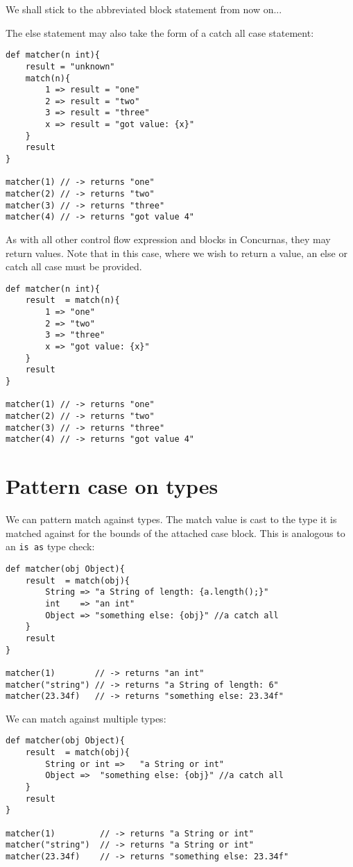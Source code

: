 \documentclass[conc-doc]{subfiles}
\begin{document}
We shall stick to the abbreviated block statement from now on...

The else statement may also take the form of a catch all case statement:
\begin{lstlisting}
def matcher(n int){
	result = "unknown"
	match(n){
		1 => result = "one" 
		2 => result = "two" 
		3 => result = "three" 
		x => result = "got value: {x}" 
	}
	result
}

matcher(1) // -> returns "one"
matcher(2) // -> returns "two"
matcher(3) // -> returns "three"
matcher(4) // -> returns "got value 4"
\end{lstlisting}

As with all other control flow expression and blocks in Concurnas, they may return values. Note that in this case, where we wish to return a value, an else or catch all case must be provided.

\begin{lstlisting}
def matcher(n int){
	result  = match(n){
		1 => "one" 
		2 => "two" 
		3 => "three" 
		x => "got value: {x}" 
	}
	result
}

matcher(1) // -> returns "one"
matcher(2) // -> returns "two"
matcher(3) // -> returns "three"
matcher(4) // -> returns "got value 4"
\end{lstlisting}

\section{Pattern case on types}
We can pattern match against types. The match value is cast to the type it is matched against for the bounds of the attached case block. This is analogous to an \lstinline{is as} type check:

\begin{lstlisting}
def matcher(obj Object){
	result  = match(obj){
		String => "a String of length: {a.length();}" 
		int    => "an int" 
		Object => "something else: {obj}" //a catch all
	}
	result
}

matcher(1) 	      // -> returns "an int"
matcher("string") // -> returns "a String of length: 6"
matcher(23.34f)   // -> returns "something else: 23.34f"
\end{lstlisting}

We can match against multiple types:

\begin{lstlisting}
def matcher(obj Object){
	result  = match(obj){
		String or int =>   "a String or int" 
		Object =>  "something else: {obj}" //a catch all
	}
	result
}

matcher(1)	       // -> returns "a String or int"
matcher("string")  // -> returns "a String or int"
matcher(23.34f)    // -> returns "something else: 23.34f"
\end{lstlisting}
\end{document}
